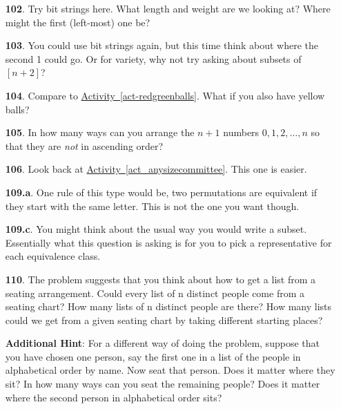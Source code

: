 \documentclass[10pt,]{book}
\theoremstyle{plain}
\theoremstyle{definition}
\theoremstyle{definition}
\theoremstyle{definition}
\numberwithin{equation}{chapter}
\begin{document}
\begin{itemize}[itemsep=1em]
\item[\textbf{102}.]\hypertarget{p-713}{}%
Try bit strings here.  What length and weight are we looking at?  Where might the first (left-most) one be?%

\item[\textbf{103}.]\hypertarget{p-718}{}%
You could use bit strings again, but this time think about where the second 1 could go.  Or for variety, why not try asking about subsets of \([n+2]\)?%

\item[\textbf{104}.]\hypertarget{p-722}{}%
Compare to \hyperref[act-redgreenballs]{Activity~\ref{act-redgreenballs}}.  What if you also have yellow balls?%

\item[\textbf{105}.]\hypertarget{p-725}{}%
In how many ways can you arrange the \(n+1\) numbers \(0, 1, 2, \ldots, n\) so that they are \emph{not} in ascending order?%

\item[\textbf{106}.]\hypertarget{p-729}{}%
Look back at \hyperref[act_anysizecommittee]{Activity~\ref{act_anysizecommittee}}.  This one is easier.%

\item[\textbf{109.a}.]\hypertarget{p-751}{}%
One rule of this type would be, two permutations are equivalent if they start with the same letter.  This is not the one you want though.%

\item[\textbf{109.c}.]\hypertarget{p-755}{}%
You might think about the usual way you would write a subset.  Essentially what this question is asking is for you to pick a representative for each equivalence class.%

\item[\textbf{110}.]\hypertarget{p-763}{}%
The problem suggests that you think about how to get a list from a seating arrangement. Could every list of n distinct people come from a seating chart? How many lists of n distinct people are there? How many lists could we get from a given seating chart by taking different starting places?%

\par\smallskip
\noindent\textbf{Additional Hint}: \hypertarget{p-764}{}%
For a different way of doing the problem, suppose that you have chosen one person, say the first one in a list of the people in alphabetical order by name. Now seat that person. Does it matter where they sit? In how many ways can you seat the remaining people? Does it matter where the second person in alphabetical order sits?%


\end{itemize}
\end{document}
